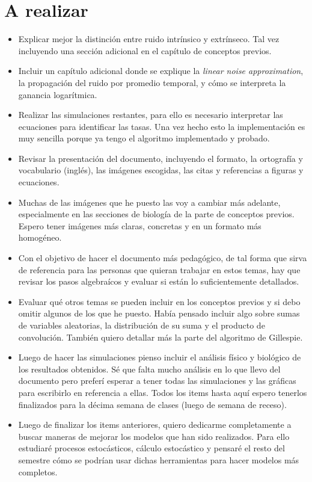 \documentclass[12pt, letterpaper]{article}
\begin{document}
\section*{A realizar}
\begin{itemize}
  \item Explicar mejor la distinci\'on entre ruido intr\'insico y extr\'inseco. Tal vez incluyendo una secci\'on adicional en el cap\'itulo de conceptos previos.
  \item Incluir un cap\'itulo adicional donde se explique la \textit{linear noise approximation}, la propagaci\'on del ruido por promedio temporal, y c\'omo se interpreta la ganancia logar\'itmica.
  \item Realizar las simulaciones restantes, para ello es necesario interpretar las ecuaciones para identificar las tasas. Una vez hecho esto la implementaci\'on es muy sencilla porque ya tengo el algoritmo implementado y probado.
  \item Revisar la presentaci\'on del documento, incluyendo el formato, la ortograf\'ia y vocabulario (ingl\'es), las im\'agenes escogidas, las citas y referencias a figuras y ecuaciones.
  \item Muchas de las im\'agenes que he puesto las voy a cambiar m\'as adelante, especialmente en las secciones de biolog\'ia de la parte de conceptos previos. Espero tener im\'agenes m\'as claras, concretas y en un formato m\'as homog\'eneo.
  \item Con el objetivo de hacer el documento m\'as pedag\'ogico, de tal forma que sirva de referencia para las personas que quieran trabajar en estos temas, hay que revisar los pasos algebra\'icos y evaluar si est\'an lo suficientemente detallados.
  \item Evaluar qu\'e otros temas se pueden incluir en los conceptos previos y si debo omitir algunos de los que he puesto. Hab\'ia pensado incluir algo sobre sumas de variables aleatorias, la distribuci\'on de su suma y el producto de convoluci\'on. Tambi\'en quiero detallar m\'as la parte del algoritmo de Gillespie.
  \item Luego de hacer las simulaciones pienso incluir el an\'alisis f\'isico y biol\'ogico de los resultados obtenidos. S\'e que falta mucho an\'alisis en lo que llevo del documento pero prefer\'i esperar a tener todas las simulaciones y las gr\'aficas para escribirlo en referencia a ellas. Todos los items hasta aqu\'i espero tenerlos finalizados para la d\'ecima semana de clases (luego de semana de receso).
  \item Luego de finalizar los items anteriores, quiero dedicarme completamente a buscar maneras de mejorar los modelos que han sido realizados. Para ello estudiar\'e procesos estoc\'asticos, c\'alculo estoc\'astico y pensar\'e el resto del semestre c\'omo se podr\'ian usar dichas herramientas para hacer modelos m\'as completos.
\end{itemize}
\end{document}
